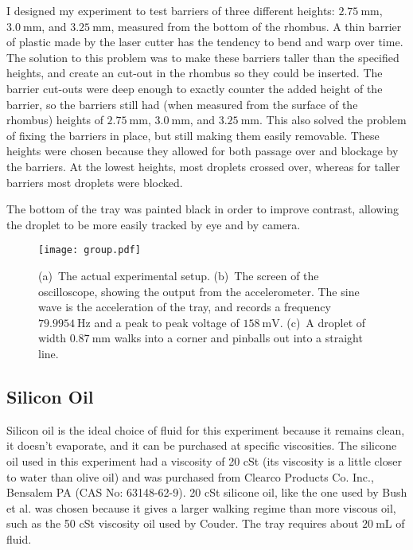 I designed my experiment to test barriers of three different heights: $2.75~\mathrm{mm}$, $3.0~\mathrm{mm}$, and $3.25~\mathrm{mm}$, measured from the bottom of the rhombus. A thin barrier of plastic made by the laser cutter has the tendency to bend and warp over time. The solution to this problem was to make these barriers taller than the specified heights, and create an cut-out in the rhombus so they could be inserted. The barrier cut-outs were deep enough to exactly counter the added height of the barrier, so the barriers still had (when measured from the surface of the rhombus) heights of $2.75~\mathrm{mm}$, $3.0~\mathrm{mm}$, and $3.25~\mathrm{mm}$. This also solved the problem of fixing the barriers in place, but still making them easily removable. These heights were chosen because they allowed for both passage over and blockage by the barriers. At the lowest heights, most droplets crossed over, whereas for taller barriers most droplets were blocked. 

The bottom of the tray was painted black in order to improve contrast, allowing the droplet to be more easily tracked by eye and by camera.

\begin{figure}
	\centering
	\texttt{[image: group.pdf]}
	\caption{(a)~The actual experimental setup. 
	(b)~The screen of the oscilloscope, showing the output from the accelerometer. The sine wave is the acceleration of the tray, and records a frequency $79.9954~\mathrm{Hz}$ and a peak to peak voltage of $158~\mathrm{mV}$. 
	(c)~A droplet of width $0.87~\mathrm{mm}$ walks into a corner and pinballs out into a straight line.}
	\label{group}
\end{figure}

\subsection{Silicon Oil}
    Silicon oil is the ideal choice of fluid for this experiment because it remains clean, it doesn't evaporate, and it can be purchased at specific viscosities. The silicone oil used in this experiment had a viscosity of 20 cSt (its viscosity is a little closer to water than olive oil) and was purchased from Clearco Products Co. Inc., Bensalem PA (CAS No: 63148-62-9). 20 cSt silicone oil, like the one used by Bush et al. was chosen because it gives a larger walking regime than more viscous oil, such as the 50 cSt viscosity oil used by Couder. The tray requires about $20~\mathrm{mL}$ of fluid.
    
